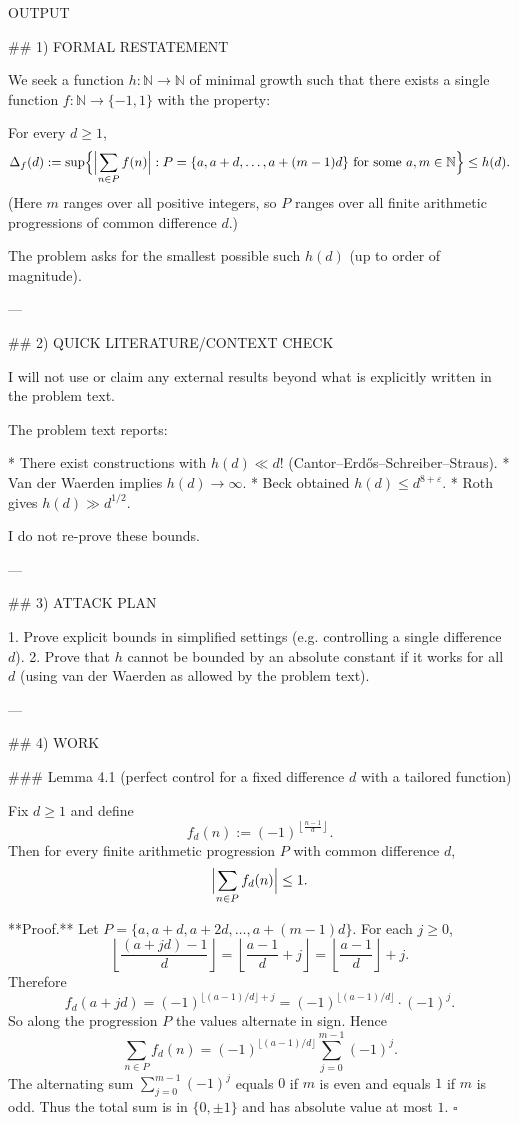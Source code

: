 OUTPUT

## 1) FORMAL RESTATEMENT

We seek a function $h:\mathbb N\to\mathbb N$ of minimal growth such that there exists a single function $f:\mathbb N\to\{-1,1\}$ with the property:

For every $d\ge 1$,
\[
\Delta_f(d):=\sup\Bigl\{\Bigl|\sum_{n\in P} f(n)\Bigr| : P=\{a,a+d,\dots,a+(m-1)d\}\text{ for some }a,m\in\mathbb N\Bigr\}\le h(d).
\]
(Here $m$ ranges over all positive integers, so $P$ ranges over all finite arithmetic progressions of common difference $d$.)

The problem asks for the smallest possible such $h(d)$ (up to order of magnitude).

---

## 2) QUICK LITERATURE/CONTEXT CHECK

I will not use or claim any external results beyond what is explicitly written in the problem text.

The problem text reports:

* There exist constructions with $h(d)\ll d!$ (Cantor–Erd\H{o}s–Schreiber–Straus).
* Van der Waerden implies $h(d)\to\infty$.
* Beck obtained $h(d)\le d^{8+\varepsilon}$.
* Roth gives $h(d)\gg d^{1/2}$.

I do not re-prove these bounds.

---

## 3) ATTACK PLAN

1. Prove explicit bounds in simplified settings (e.g. controlling a single difference $d$).
2. Prove that $h$ cannot be bounded by an absolute constant if it works for all $d$ (using van der Waerden as allowed by the problem text).

---

## 4) WORK

### Lemma 4.1 (perfect control for a fixed difference $d$ with a tailored function)

Fix $d\ge 1$ and define
\[
f_d(n):=(-1)^{\left\lfloor\frac{n-1}{d}\right\rfloor}.
\]
Then for every finite arithmetic progression $P$ with common difference $d$,
\[
\Bigl|\sum_{n\in P} f_d(n)\Bigr|\le 1.
\]

**Proof.**
Let $P=\{a,a+d,a+2d,\dots,a+(m-1)d\}$.
For each $j\ge 0$,
\[
\left\lfloor\frac{(a+jd)-1}{d}\right\rfloor
=\left\lfloor\frac{a-1}{d}+j\right\rfloor
=\left\lfloor\frac{a-1}{d}\right\rfloor + j.
\]
Therefore
\[
f_d(a+jd)=(-1)^{\lfloor(a-1)/d\rfloor+j}=(-1)^{\lfloor(a-1)/d\rfloor}\cdot (-1)^j.
\]
So along the progression $P$ the values alternate in sign. Hence
\[
\sum_{n\in P} f_d(n)=(-1)^{\lfloor(a-1)/d\rfloor}\sum_{j=0}^{m-1} (-1)^j.
\]
The alternating sum $\sum_{j=0}^{m-1}(-1)^j$ equals $0$ if $m$ is even and equals $1$ if $m$ is odd.
Thus the total sum is in $\{0,\pm 1\}$ and has absolute value at most $1$.
$\square$


